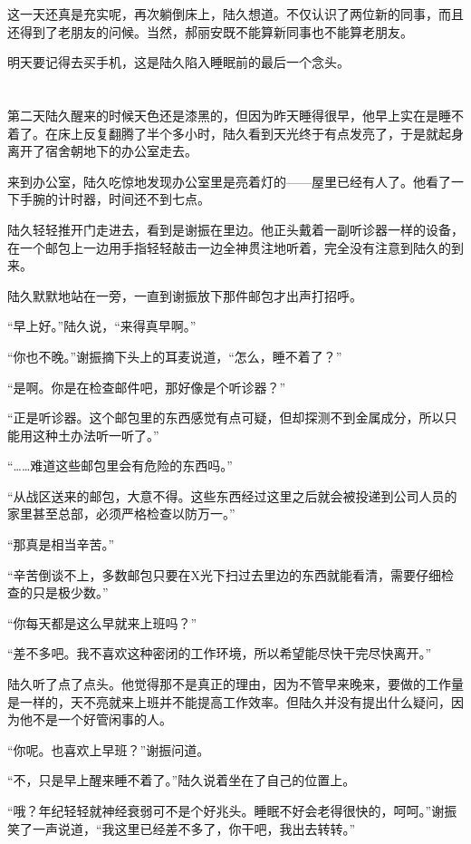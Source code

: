 这一天还真是充实呢，再次躺倒床上，陆久想道。不仅认识了两位新的同事，而且还得到了老朋友的问候。当然，郝丽安既不能算新同事也不能算老朋友。

明天要记得去买手机，这是陆久陷入睡眠前的最后一个念头。



\section*{}

第二天陆久醒来的时候天色还是漆黑的，但因为昨天睡得很早，他早上实在是睡不着了。在床上反复翻腾了半个多小时，陆久看到天光终于有点发亮了，于是就起身离开了宿舍朝地下的办公室走去。

来到办公室，陆久吃惊地发现办公室里是亮着灯的——屋里已经有人了。他看了一下手腕的计时器，时间还不到七点。

陆久轻轻推开门走进去，看到是谢振在里边。他正头戴着一副听诊器一样的设备，在一个邮包上一边用手指轻轻敲击一边全神贯注地听着，完全没有注意到陆久的到来。

陆久默默地站在一旁，一直到谢振放下那件邮包才出声打招呼。

“早上好。”陆久说，“来得真早啊。”

“你也不晚。”谢振摘下头上的耳麦说道，“怎么，睡不着了？”

“是啊。你是在检查邮件吧，那好像是个听诊器？”

“正是听诊器。这个邮包里的东西感觉有点可疑，但却探测不到金属成分，所以只能用这种土办法听一听了。”

“……难道这些邮包里会有危险的东西吗。”

“从战区送来的邮包，大意不得。这些东西经过这里之后就会被投递到公司人员的家里甚至总部，必须严格检查以防万一。”

“那真是相当辛苦。”

“辛苦倒谈不上，多数邮包只要在X光下扫过去里边的东西就能看清，需要仔细检查的只是极少数。”

“你每天都是这么早就来上班吗？”

“差不多吧。我不喜欢这种密闭的工作环境，所以希望能尽快干完尽快离开。”

陆久听了点了点头。他觉得那不是真正的理由，因为不管早来晚来，要做的工作量是一样的，天不亮就来上班并不能提高工作效率。但陆久并没有提出什么疑问，因为他不是一个好管闲事的人。

“你呢。也喜欢上早班？”谢振问道。

“不，只是早上醒来睡不着了。”陆久说着坐在了自己的位置上。

“哦？年纪轻轻就神经衰弱可不是个好兆头。睡眠不好会老得很快的，呵呵。”谢振笑了一声说道，“我这里已经差不多了，你干吧，我出去转转。”

